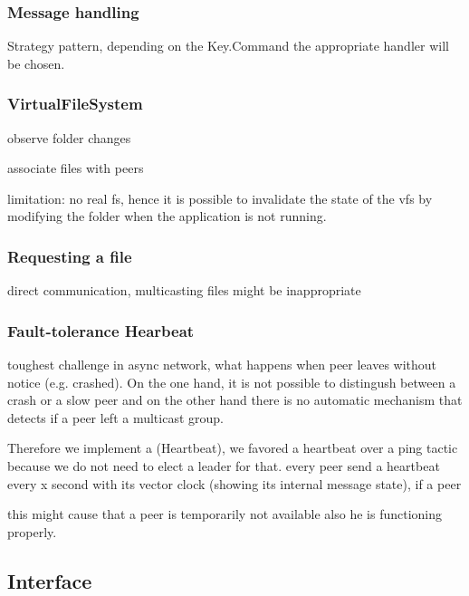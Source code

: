     \subsubsection{Message handling}
    Strategy pattern, depending on the Key.Command the appropriate handler will be chosen.
    
    \subsubsection{VirtualFileSystem}
    
    observe folder changes
    
    associate files with peers
    
    limitation: no real fs, hence it is possible to invalidate the state of the vfs by modifying the folder when the application is not running. 
    
    \subsubsection{Requesting a file}
    
    direct communication, multicasting files might be inappropriate
    
    \subsubsection{Fault-tolerance Hearbeat}
    toughest challenge in async network, what happens when peer leaves without notice (e.g. crashed). On the one hand, it is not possible to distingush between a crash or a slow peer and  on the other hand there is no automatic mechanism that detects if a peer left a multicast group.
    
    Therefore we implement a (Heartbeat), we favored a heartbeat over a ping tactic because we do not need to elect a leader for that. 
    every peer send a heartbeat every x second with its vector clock (showing its internal message state), if a peer 
    
    this might cause that a peer is temporarily not available also he is functioning properly.
    

    
    
    

\subsection{Interface}